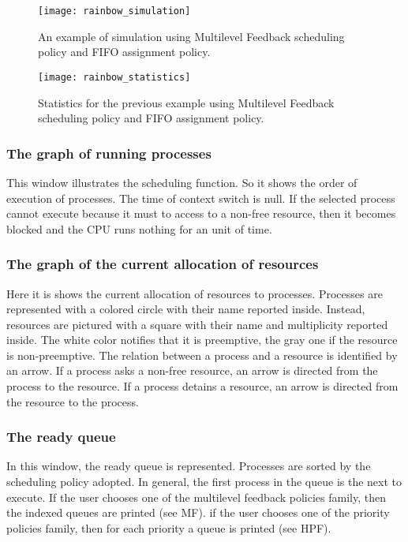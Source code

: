 \documentclass[10pt,a4paper,twoside,titlepage]{article}
\begin{document}
\begin{figure}[tb]
	\begin{center}
		\texttt{[image: rainbow\_simulation]}
		\caption[An example of simulation]{An example of simulation using Multilevel Feedback scheduling policy and FIFO assignment policy.}
		\label{fig:rainbow_simulation}
	\end{center}
\end{figure}
\begin{figure}[tb]
	\begin{center}
		\texttt{[image: rainbow\_statistics]}
		\caption[An example of statistics view]{Statistics for the previous example using Multilevel Feedback scheduling policy and FIFO assignment policy.}
		\label{fig:rainbow_statistics}
	\end{center}
\end{figure}



\subsubsection{The graph of running processes}
\label{subsubsec:The graph of running processes}
This window illustrates the scheduling function. So it shows the order of execution of processes. The time of context switch is null. If the selected process cannot execute because it must to access to a non-free resource, then it becomes blocked and the CPU runs nothing for an unit of time.

\subsubsection{The graph of the current allocation of resources}
\label{subsubsec:The graph of the current allocation of resources}
Here it is shows the current allocation of resources to processes. Processes are represented with a colored circle with their name reported inside. Instead, resources are pictured with a square with their name and multiplicity reported inside. The white color notifies that it is preemptive, the gray one if the resource is non-preemptive. The relation between a process and a resource is identified by an arrow. If a process asks a non-free resource, an arrow is directed from the process to the resource. If a process detains a resource, an arrow is directed from the resource to the process.

\subsubsection{The ready queue}
\label{subsubsec:The ready queue}
In this window, the ready queue is represented. Processes are sorted by the scheduling policy adopted. In general, the first process in the queue is the next to execute. If the user chooses one of the multilevel feedback policies family, then the indexed queues are printed (see MF). if the user chooses one of the priority policies family, then for each priority a queue is printed (see HPF).
\end{document}
